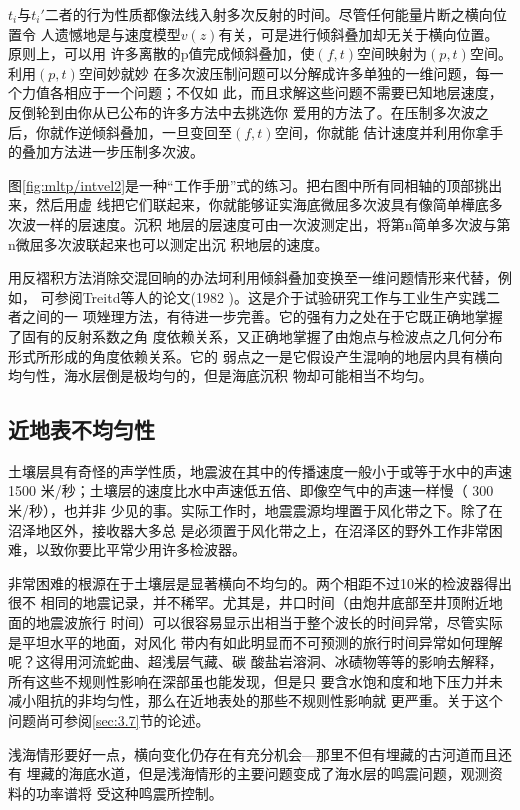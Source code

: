 $t_i$与$t_i'$二者的行为性质都像法线入射多次反射的时间。尽管任何能量片断之横向位置令
人遗憾地是与速度模型$v(z)$有关，可是进行倾斜叠加却无关于横向位置。原则上，可以用
许多离散的p值完成倾斜叠加，使$(f,t)$空间映射为$(p,t)$空间。利用$(p,t)$空间妙就妙
在多次波压制问题可以分解成许多单独的一维问题，每一个力值各相应于一个问题；不仅如
此，而且求解这些问题不需要已知地层速度，反倒轮到由你从已公布的许多方法中去挑选你
爱用的方法了。在压制多次波之后，你就作逆倾斜叠加，一旦变回至$(f,t)$空间，你就能
佶计速度并利用你拿手的叠加方法进一步压制多次波。

图\ref{fig:mltp/intvel2}是一种“工作手册”式的练习。把右图中所有同相轴的顶部挑出来，然后用虚
线把它们联起来，你就能够证实海底微屈多次波具有像简单樺底多次波一样的层速度。沉积
地层的层速度可由一次波测定出，将第n简单多次波与第n微屈多次波联起来也可以测定出沉
积地层的速度。

用反褶积方法消除交混回晌的办法坷利用倾斜叠加变换至一维问题情形来代替，例如，
可参阅Treitd等人的论文(1982
)。这是介于试验研究工作与工业生产实践二者之间的一
项矬理方法，有待进一步完善。它的强有力之处在于它既正确地掌握了固有的反射系数之角
度依赖关系，又正确地掌握了由炮点与检波点之几何分布形式所形成的角度依赖关系。它的
弱点之一是它假设产生混响的地层内具有横向均勻性，海水层倒是极均勻的，但是海底沉积
物却可能相当不均匀。

\subsection{近地表不均匀性}
\label{sec:5.6.2}

土壤层具有奇怪的声学性质，地震波在其中的传播速度一般小于或等于水中的声速1500
米/秒；土壤层的速度比水中声速低五倍、即像空气中的声速一样慢（
300米/秒），也并非
少见的事。实际工作时，地震震源均埋置于风化带之下。除了在沼泽地区外，接收器大多总
是必须置于风化带之上，在沼泽区的野外工作非常困难，以致你要比平常少用许多检波器。

非常困难的根源在于土壤层是显著横向不均匀的。两个相距不过10米的检波器得出很不
相同的地震记录，并不稀罕。尤其是，井口时间（由炮井底部至井顶附近地面的地震波旅行
时间）可以很容易显示出相当于整个波长的时间异常，尽管实际是平坦水平的地面，对风化
带内有如此明显而不可预测的旅行时间异常如何理解呢？这得用河流蛇曲、超浅层气藏、碳
酸盐岩溶洞、冰碛物等等的影响去解释，所有这些不规则性影响在深部虽也能发现，但是只
要含水饱和度和地下压力并未减小阻抗的非均匀性，那么在近地表处的那些不规则性影响就
更严重。关于这个问题尚可参阅\ref{sec:3.7}节的论述。

浅海情形要好一点，横向变化仍存在有充分机会---那里不但有埋藏的古河道而且还有
埋藏的海底水道，但是浅海情形的主要问题变成了海水层的鸣震问题，观测资料的功率谱将
受这种鸣震所控制。

